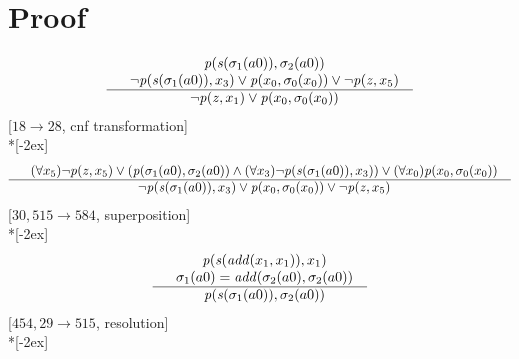 \documentclass[fleqn]{article}
\newenvironment{VampireProof}{%
   \section{Proof}}{}
\newenvironment{VampireInference}{%
   \begin{array}{c}}{\end{array}}
\newenvironment{VampirePremise}%
   {\begin{array}{l}}%
   {\end{array}}
\newenvironment{VampireConclusion}%
   {\begin{array}{l}}%
   {\end{array}}
\newcommand{\VPremiseSeparator}{\\}
\newcommand{\VConclusionSeparator}{\\ \hline}
\newcommand{\Vor}{\vee}
\newcommand{\Vand}{\wedge}
\begin{document}
\begin{VampireProof}
\[\begin{VampireInference}
\begin{VampirePremise}
~~\mathit{p} (\mathit{s} (\sigma_{1}(a0)),\sigma_{2}(a0))
\end{VampirePremise}
\VPremiseSeparator
\begin{VampirePremise}%
~~\neg \mathit{p} (\mathit{s} (\sigma_{1}(a0)),x_{3}) \Vor \mathit{p} (x_{0},\sigma_{0}(x_{0})) \Vor \neg \mathit{p} (\mathit{z},x_{5})
\end{VampirePremise}
\VConclusionSeparator
\begin{VampireConclusion}
~~\neg \mathit{p} (\mathit{z},x_{1}) \Vor \mathit{p} (x_{0},\sigma_{0}(x_{0}))
\end{VampireConclusion}
\end{VampireInference}
\]
[$18\rightarrow 28$, cnf transformation]\\*[-2ex]
\[\begin{VampireInference}
\begin{VampirePremise}%
~~(\forall x_{5} )\neg \mathit{p} (\mathit{z},x_{5}) \Vor (\mathit{p} (\sigma_{1}(a0),\sigma_{2}(a0)) \Vand (\forall x_{3} )\neg \mathit{p} (\mathit{s} (\sigma_{1}(a0)),x_{3})) \Vor (\forall x_{0} )\mathit{p} (x_{0},\sigma_{0}(x_{0}))
\end{VampirePremise}
\VConclusionSeparator
\begin{VampireConclusion}
~~\neg \mathit{p} (\mathit{s} (\sigma_{1}(a0)),x_{3}) \Vor \mathit{p} (x_{0},\sigma_{0}(x_{0})) \Vor \neg \mathit{p} (\mathit{z},x_{5})
\end{VampireConclusion}
\end{VampireInference}
\]
[$30,515\rightarrow 584$, superposition]\\*[-2ex]
\[\begin{VampireInference}
\begin{VampirePremise}%
~~\mathit{p} (\mathit{s} (\mathit{add} (x_{1},x_{1})),x_{1})
\end{VampirePremise}
\VPremiseSeparator
\begin{VampirePremise}%
~~\sigma_{1}(a0) = \mathit{add} (\sigma_{2}(a0),\sigma_{2}(a0))
\end{VampirePremise}
\VConclusionSeparator
\begin{VampireConclusion}
~~\mathit{p} (\mathit{s} (\sigma_{1}(a0)),\sigma_{2}(a0))
\end{VampireConclusion}
\end{VampireInference}
\]
[$454,29\rightarrow 515$, resolution]\\*[-2ex]
\[\begin{VampireInference}
\begin{VampirePremise}%

\end{VampirePremise}
\end{VampireInference}\]
\end{VampireProof}
\end{document}
